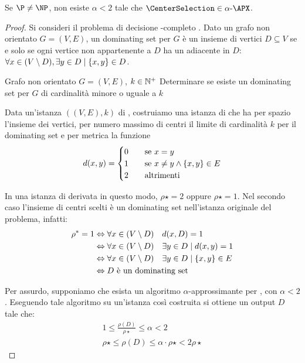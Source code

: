 \begin{theorem}
	Se $\P\neq\NP$, non esiste $\alpha<2$ tale che $\CenterSelection\in\gAPX\alpha$.
\end{theorem}
\begin{proof}
	Si consideri il problema di decisione \NP-completo \DominatingSet. Dato un grafo non orientato $G=(V,E)$, un dominating set per $G$ è un insieme di vertici $D\subseteq V$ se e solo se ogni vertice non appartenente a $D$ ha un adiacente in $D$: $\forall x\in(V\setminus D),\exists y\in D\mid \left\{ x,y \right\}\in D$.

	\pdec{\DominatingSet}
	{Grafo non orientato $G=(V,E)$, $k\in\mathbb N^+$}
	{Determinare se esiste un dominating set per $G$ di cardinalità minore o uguale a $k$}

	Data un'istanza $((V,E),k)$ di \DominatingSet, costruiamo una istanza di \CenterSelection che ha per spazio l'insieme dei vertici, per numero massimo di centri il limite di cardinalità $k$ per il dominating set e per metrica la funzione
	\begin{equation*}
		d(x,y) =
		\begin{cases}
			0 \quad & \text{se } x = y                      \\
			1 \quad & \text{se } x\neq y\land\left\{ x,y \right\}\in E \\
			2 \quad & \text{altrimenti}
		\end{cases}
	\end{equation*}

	In una istanza di \CenterSelection derivata in questo modo, $\rho\star=2$ oppure $\rho\star=1$. Nel secondo caso l'insieme di centri scelti è un dominating set nell'istanza originale del problema, infatti:
	\begin{align*}
		\rho^*=1 & \Leftrightarrow\forall x\in(V\setminus D)\quad d(x,D)=1                             \\
		            & \Leftrightarrow\forall x \in (V \setminus D)\quad \exists y\in D\mid d(x,y)=1       \\
		            & \Leftrightarrow\forall x \in (V \setminus D)\quad \exists y\in D\mid \left\{ x,y \right\}\in E \\
		            & \Leftrightarrow D\text{ è un dominating set}
	\end{align*}

	Per assurdo, supponiamo che esista un algoritmo $\alpha$-approssimante per \CenterSelection, con $\alpha < 2$. Eseguendo tale algoritmo su un'istanza così costruita si ottiene un output $D$ tale che:
	\begin{gather*}
		1\leq\frac{\rho(D)}{\rho\star}\leq\alpha<2 \\
		\rho\star\leq\rho(D)\leq\alpha\cdot\rho\star<2\rho\star
	\end{gather*}


\end{proof}
